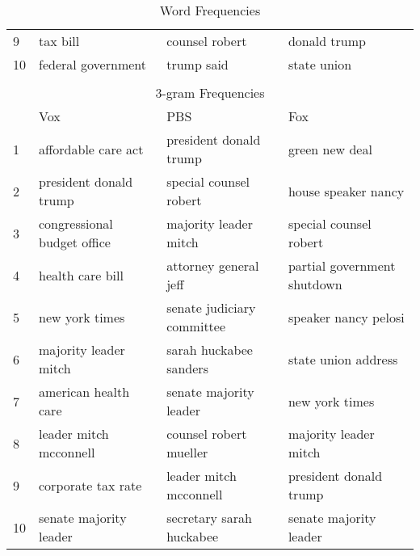 \begin{table}[H]
\begin{tabular}{|l|l|l|l|}
    9   & tax bill             & counsel robert     & donald trump    \\
    10  & federal government   & trump said         & state union     \\ \hline \hline
    \multicolumn{4}{|c|}{}                                                                                         \\ 
    \multicolumn{4}{|c|}{3-gram Frequencies}                                                                       \\ \hline
        & Vox                         & PBS                              & Fox                   \\ \hline \hline
    1   & affordable care act         & president donald trump     & green new deal              \\ 
    2   & president donald trump      & special counsel robert     & house speaker nancy         \\ 
    3   & congressional budget office & majority leader mitch      & special counsel robert      \\
    4   & health care bill            & attorney general jeff      & partial government shutdown \\
    5   & new york times              & senate judiciary committee & speaker nancy pelosi        \\
    6   & majority leader mitch       & sarah huckabee sanders     & state union address         \\
    7   & american health care        & senate majority leader     & new york times              \\
    8   & leader mitch mcconnell      & counsel robert mueller     & majority leader mitch       \\
    9   & corporate tax rate          & leader mitch mcconnell     & president donald trump      \\
    10  & senate majority leader      & secretary sarah huckabee   & senate majority leader      \\ \hline

    \end{tabular}
    \caption{Word Frequencies}
    \label{tab:ngram}
\end{table}
